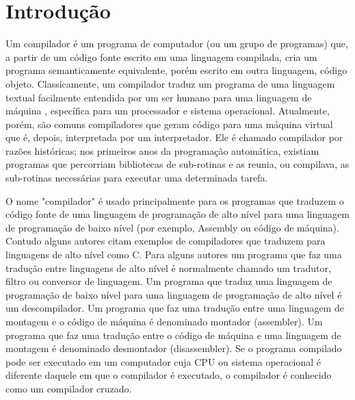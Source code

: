 \chapter{Introdução}

Um compilador é um programa de computador (ou um grupo de programas) que, a partir de um código fonte escrito em uma linguagem compilada, cria um programa semanticamente equivalente, porém escrito em outra linguagem, código objeto. Classicamente, um compilador traduz um programa de uma linguagem textual facilmente entendida por um ser humano para uma linguagem de máquina , específica para um processador e sistema operacional. Atualmente, porém, são comuns compiladores que geram código para uma máquina virtual que é, depois, interpretada por um interpretador. Ele é chamado compilador por razões históricas; nos primeiros anos da programação automática, existiam programas que percorriam bibliotecas de sub-rotinas e as reunia, ou compilava, as sub-rotinas necessárias para executar uma determinada tarefa.

O nome "compilador" é usado principalmente para os programas que traduzem o código fonte de uma linguagem de programação de alto nível para uma linguagem de programação de baixo nível (por exemplo, Assembly ou código de máquina). Contudo alguns autores citam exemplos de compiladores que traduzem para linguagens de alto nível como C. Para alguns autores um programa que faz uma tradução entre linguagens de alto nível é normalmente chamado um tradutor, filtro ou conversor de linguagem. Um programa que traduz uma linguagem de programação de baixo nível para uma linguagem de programação de alto nível é um descompilador. Um programa que faz uma tradução entre uma linguagem de montagem e o código de máquina é denominado montador (assembler). Um programa que faz uma tradução entre o código de máquina e uma linguagem de montagem é denominado desmontador (disassembler). Se o programa compilado pode ser executado em um computador cuja CPU ou sistema operacional é diferente daquele em que o compilador é executado, o compilador é conhecido como um compilador cruzado.